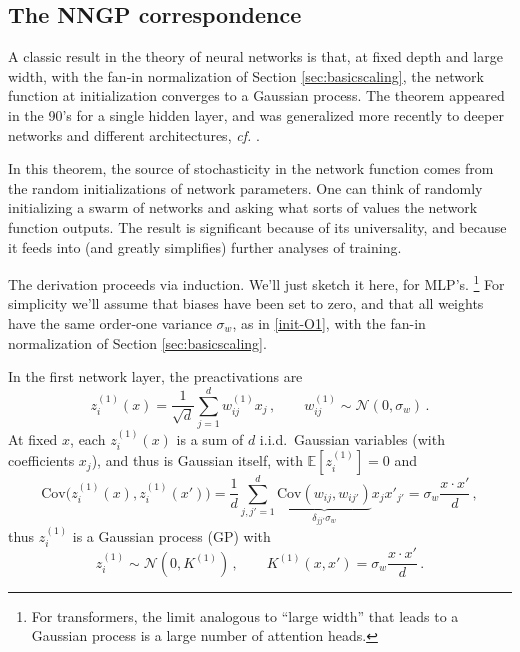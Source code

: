 \documentclass[11pt]{article}
\newcommand{\E}{\mathbb{E}}
\newcommand{\CN}{{\mathcal N}}
\begin{document}
\subsection{The NNGP correspondence}
\label{sec:NNGP}

A classic result in the theory of neural networks is that, at fixed depth and large width, with the fan-in normalization of Section \ref{sec:basicscaling}, the network function at initialization converges to a Gaussian process. The theorem appeared in the 90's \cite{neal1996bayesian} for a single hidden layer, and was generalized more recently to deeper networks and different architectures, \emph{cf.} \cite{lee2018deep, yang2019tensorprograms1, hanin2023random}.

In this theorem, the source of stochasticity in the network function comes from the random initializations of network parameters. One can think of randomly initializing a swarm of networks and asking what sorts of values the network function outputs. The result is significant because of its universality, and because it feeds into (and greatly simplifies) further analyses of training.

The derivation proceeds via induction. We'll just sketch it here, for MLP's.%
%
\footnote{For transformers, the limit analogous to ``large width'' that leads to a Gaussian process is a large number of attention heads.} %
%
For simplicity we'll assume that biases have been set to zero, and that all weights have the same order-one variance $\sigma_w$, as in \eqref{init-O1}, with the fan-in normalization of Section \ref{sec:basicscaling}.

In the first network layer, the preactivations are
%
\begin{equation}
    z_i^{(1)}(x) = \frac{1}{\sqrt d}\sum_{j=1}^d w_{ij}^{(1)}x_j\,,\qquad w_{ij}^{(1)}\sim \CN(0,\sigma_w)\,.
\end{equation}
%
At fixed $x$, each $z_i^{(1)}(x)$ is a sum of $d$ i.i.d.\ Gaussian variables (with coefficients $x_j$), and thus is Gaussian itself, with $\E[z_i^{(1)}] = 0$ and
%
\begin{equation} \text{Cov}\big(z_i^{(1)}(x),z_i^{(1)}(x')\big) = \frac{1}{d}\sum_{j,j'=1}^d \underbrace{\text{Cov}(w_{ij},w_{ij'})}_{\delta_{jj'} \sigma_w}x_j x'_{j'}  = \sigma_w\frac{x\cdot x'}{d}\,,
\end{equation}  
%
thus $z_i^{(1)}$ is a Gaussian process (GP) with
%
\begin{equation} z_i^{(1)} \sim \CN(0,K^{(1)})\,,\qquad K^{(1)}(x,x') = \sigma_w\frac{x\cdot x'}{d}\,. \end{equation}
\end{document}

